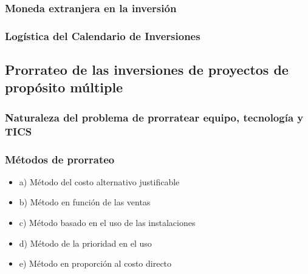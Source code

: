\documentclass[crop=false]{standalone}
\begin{document}
\subsubsection{Moneda extranjera en la inversión}
\subsubsection{Logística del  Calendario de Inversiones}

\subsection{Prorrateo de las inversiones de proyectos de propósito múltiple}

\subsubsection{Naturaleza del problema de prorratear equipo, tecnología y TICS}
\subsubsection{Métodos de prorrateo}

\begin{itemize}
    \item a) Método del costo alternativo justificable
    \item b) Método en función de las ventas
    \item c) Método basado en el uso de las instalaciones
    \item d) Método de la prioridad en el uso
    \item e) Método en proporción al costo directo


    
\end{itemize}

\end{document}
